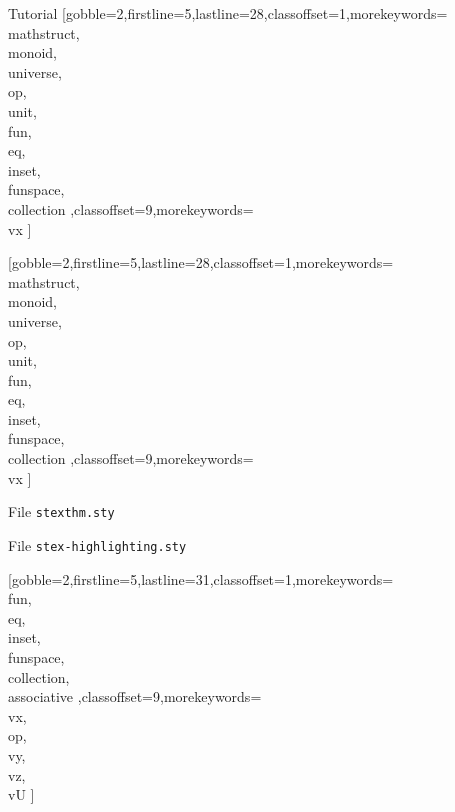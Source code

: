 \documentclass[lang={en,de}]{stex}
\begin{document}
\begin{sfragment}{Tutorial}
    [gobble=2,firstline=5,lastline=28,classoffset=1,morekeywords={
    \\mathstruct,\\monoid,\\universe,\\op,\\unit,\\fun,\\eq,\\inset,
    \\funspace,\\collection
    },classoffset=9,morekeywords={
      \\vx
    }]

    [gobble=2,firstline=5,lastline=28,classoffset=1,morekeywords={
    \\mathstruct,\\monoid,\\universe,\\op,\\unit,\\fun,\\eq,\\inset,
    \\funspace,\\collection
    },classoffset=9,morekeywords={
      \\vx
    }]

    \begin{sexample}
      \begin{mdframed}[linewidth=1pt,backgroundcolor=white]\small
        \hfill File \texttt{stexthm.sty}
        
      \end{mdframed}
    \end{sexample}

    \begin{sexample}
      \begin{mdframed}[linewidth=1pt,backgroundcolor=white]\small
        \hfill File \texttt{stex-highlighting.sty}
        
        
      \end{mdframed}
    \end{sexample}

    [gobble=2,firstline=5,lastline=31,classoffset=1,morekeywords={
    \\fun,\\eq,\\inset,
    \\funspace,\\collection,\\associative
    },classoffset=9,morekeywords={
      \\vx,\\op,\\vy,\\vz,\\vU
    }]


\end{sfragment}
\end{document}
